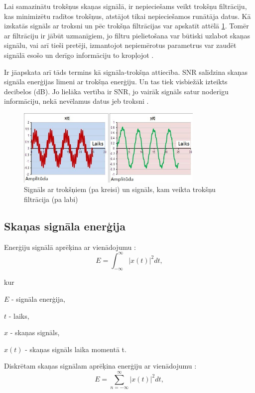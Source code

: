 \documentclass[12pt,paper=A4]{report}
\begin{document}
Lai samazinātu trokšņus skaņas signālā, ir nepieciešams veikt trokšņu filtrāciju, kas minimizētu radītos trokšņus, atstājot tikai nepieciešamos runātāja datus. Kā izskatās signāls ar troksni un pēc trokšņa filtrācijas var apskatīt attēlā \ref{nois}. Tomēr ar filtrāciju ir jābūt uzmanīgiem, jo filtru pielietošana var būtiski uzlabot skaņas signālu, vai arī tieši pretēji, izmantojot nepiemērotus parametrus var zaudēt signālā esošo un derīgo informāciju to kropļojot \cite{https://www.nde-ed.org/EducationResources/CommunityCollege/EddyCurrents/Procedures/SignalFiltering.htm}.

Ir jāapskata arī tāds termins kā signāla-trokšņa attiecība. SNR salīdzina skaņas signāla enerģijas līmeni ar trokšņa enerģiju. Un tas tiek visbiežāk izteikts decibelos (dB). Jo lielāka vertība ir SNR, jo vairāk signāls satur noderīgu informāciju, nekā nevēlamus datus jeb troksni \cite{https://www.lifewire.com/signal-to-noise-ratio-3134701}.


\begin{figure}[H] \centering
\includegraphics[width=0.80\textwidth]{LowPass} 
\caption{Signāls ar trokšņiem (pa kreisi) un signāls, kam veikta trokšņu filtrācija (pa labi) \cite{dtw4}}  \label{nois} 
\end{figure}

\FloatBarrier

\subsection{Skaņas signāla enerģija}
Enerģiju signālā aprēķina ar vienādojumu \cite{energy}:
\begin{equation}
E = \int^\infty_{- \infty}|x(t)|^2dt,
\end{equation}

kur

$E$ - signāla enerģija,

$t$ - laiks,

$x$ - skaņas signāls,

$x(t)$ - skaņas signāls laika momentā t.

Diskrētam skaņas signālam aprēķina enerģiju ar vienādojumu :
\begin{equation}
E = \sum^\infty_{n =- \infty}|x(t)|^2dt,
\end{equation}
\end{document}
